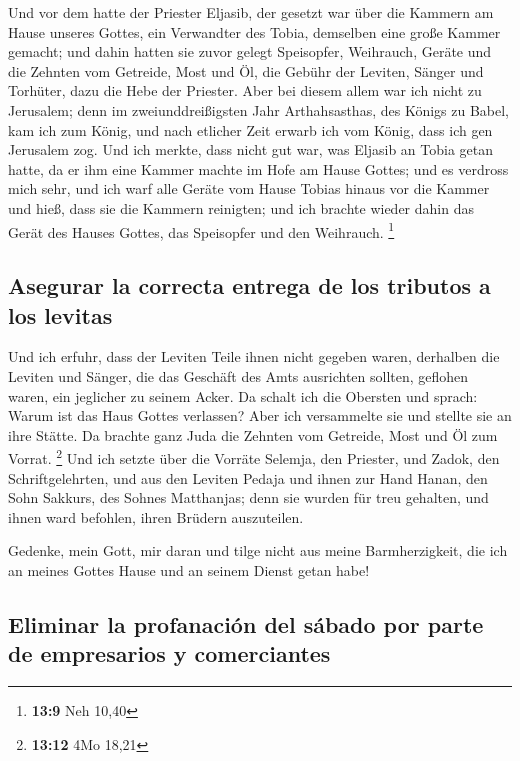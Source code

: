  Und vor dem hatte der Priester Eljasib, der gesetzt war
über die Kammern am Hause unseres Gottes, ein Verwandter des Tobia,
demselben eine große Kammer gemacht;  und dahin hatten sie
zuvor gelegt Speisopfer, Weihrauch, Geräte und die Zehnten vom Getreide,
Most und Öl, die Gebühr der Leviten, Sänger und Torhüter, dazu die Hebe
der Priester.  Aber bei diesem allem war ich nicht zu
Jerusalem; denn im zweiunddreißigsten Jahr Arthahsasthas, des Königs zu
Babel, kam ich zum König, und nach etlicher Zeit erwarb ich vom König,
 dass ich gen Jerusalem zog. Und ich merkte, dass nicht
gut war, was Eljasib an Tobia getan hatte, da er ihm eine Kammer machte
im Hofe am Hause Gottes;  und es verdross mich sehr, und
ich warf alle Geräte vom Hause Tobias hinaus vor die Kammer
 und hieß, dass sie die Kammern reinigten; und ich brachte
wieder dahin das Gerät des Hauses Gottes, das Speisopfer und den
Weihrauch. \footnote{\textbf{13:9} Neh 10,40}

\hypertarget{asegurar-la-correcta-entrega-de-los-tributos-a-los-levitas}{%
\subsection{Asegurar la correcta entrega de los tributos a los
levitas}\label{asegurar-la-correcta-entrega-de-los-tributos-a-los-levitas}}

 Und ich erfuhr, dass der Leviten Teile ihnen nicht
gegeben waren, derhalben die Leviten und Sänger, die das Geschäft des
Amts ausrichten sollten, geflohen waren, ein jeglicher zu seinem Acker.
 Da schalt ich die Obersten und sprach: Warum ist das
Haus Gottes verlassen? Aber ich versammelte sie und stellte sie an ihre
Stätte.  Da brachte ganz Juda die Zehnten vom Getreide,
Most und Öl zum Vorrat. \footnote{\textbf{13:12} 4Mo 18,21}
 Und ich setzte über die Vorräte Selemja, den Priester,
und Zadok, den Schriftgelehrten, und aus den Leviten Pedaja und ihnen
zur Hand Hanan, den Sohn Sakkurs, des Sohnes Matthanjas; denn sie wurden
für treu gehalten, und ihnen ward befohlen, ihren Brüdern auszuteilen.

 Gedenke, mein Gott, mir daran und tilge nicht aus meine
Barmherzigkeit, die ich an meines Gottes Hause und an seinem Dienst
getan habe!

\hypertarget{eliminar-la-profanaciuxf3n-del-suxe1bado-por-parte-de-empresarios-y-comerciantes}{%
\subsection{Eliminar la profanación del sábado por parte de empresarios
y
comerciantes}\label{eliminar-la-profanaciuxf3n-del-suxe1bado-por-parte-de-empresarios-y-comerciantes}}

